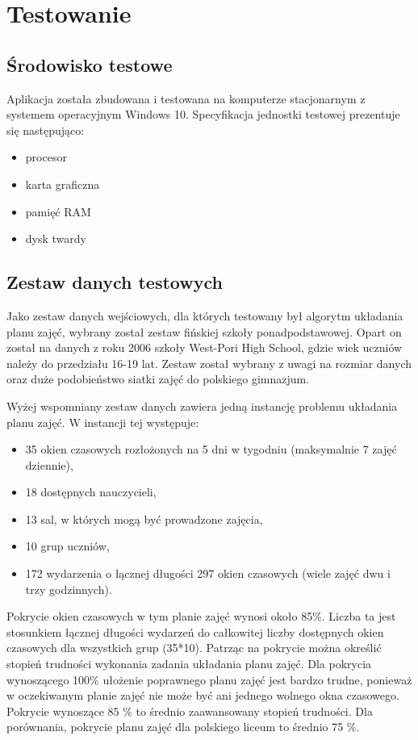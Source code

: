 \chapter{Testowanie}

\section{Środowisko testowe}

Aplikacja została zbudowana i testowana na komputerze stacjonarnym z systemem operacyjnym Windows 10. Specyfikacja jednostki testowej prezentuje się następująco:

\begin{itemize}
\item procesor 
\item karta graficzna
\item pamięć RAM
\item dysk twardy
\end{itemize}

\section{Zestaw danych testowych}

Jako zestaw danych wejściowych, dla których testowany był algorytm układania planu zajęć, wybrany został zestaw fińskiej szkoły ponadpodstawowej. Opart on został na danych z roku 2006 szkoły West-Pori High School, gdzie wiek uczniów należy do przedziału 16-19 lat. Zestaw został wybrany z uwagi na rozmiar danych oraz duże podobieństwo siatki zajęć do polskiego gimnazjum.

Wyżej wspomniany zestaw danych zawiera jedną instancję problemu układania planu zajęć. W instancji tej występuje:

\begin{itemize}
\item 35 okien czasowych rozłożonych na 5 dni w tygodniu (maksymalnie 7 zajęć dziennie),
\item 18 dostępnych nauczycieli,
\item 13 sal, w których mogą być prowadzone zajęcia,
\item 10 grup uczniów,
\item 172 wydarzenia o łącznej długości 297 okien czasowych (wiele zajęć dwu i trzy godzinnych).
\end{itemize}

Pokrycie okien czasowych w tym planie zajęć wynosi około 85\%. Liczba ta jest stosunkiem łącznej długości wydarzeń do całkowitej liczby dostępnych okien czasowych dla wszystkich grup (35*10). Patrząc na pokrycie można określić stopień trudności wykonania zadania układania planu zajęć. Dla pokrycia wynoszącego 100\% ułożenie poprawnego planu zajęć jest bardzo trudne, ponieważ w oczekiwanym planie zajęć nie może być ani jednego wolnego okna czasowego. Pokrycie wynoszące 85 \% to średnio zaawansowany stopień trudności. Dla porównania, pokrycie planu zajęć dla polskiego liceum to średnio 75 \%.

